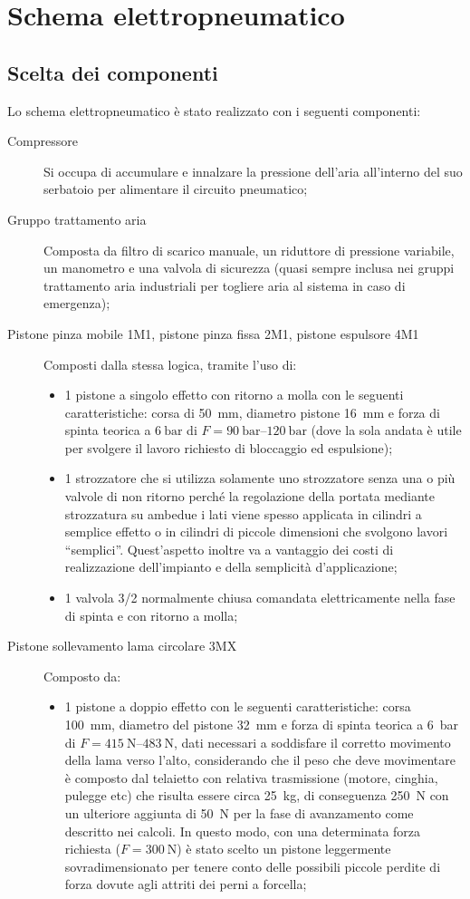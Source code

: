 \documentclass{report}
\begin{document}
\section{Schema elettropneumatico}
\subsection{Scelta dei componenti}
Lo schema elettropneumatico è stato realizzato con i seguenti componenti:
\begin{description}
\item[Compressore] Si occupa di accumulare e innalzare la pressione dell’aria all’interno del suo serbatoio per alimentare il circuito pneumatico;
\item[Gruppo trattamento aria] Composta da filtro di scarico manuale, un riduttore di pressione variabile, un manometro e una valvola di sicurezza (quasi sempre inclusa nei gruppi trattamento aria industriali per togliere aria al sistema in caso di emergenza);
\item[Pistone pinza mobile 1M1, pistone pinza fissa 2M1, pistone espulsore 4M1] Composti dalla stessa logica, tramite l'uso di:
  \begin{itemize}
  \item 1 pistone a singolo effetto con ritorno a molla con le seguenti caratteristiche: corsa di \SI{50}{\mm}, diametro pistone \SI{16}{\mm} e forza di spinta teorica a $\SI{6}{\bar}$ di $F=\SIrange{90}{120}{\bar}$ (dove la sola andata è utile per svolgere il lavoro richiesto di bloccaggio ed espulsione);
  \item 1 strozzatore che si utilizza solamente uno strozzatore senza una o più valvole di non ritorno perché la regolazione della portata mediante strozzatura su ambedue i lati viene spesso applicata in cilindri a semplice effetto o in cilindri di piccole dimensioni che svolgono lavori “semplici”. Quest’aspetto inoltre va a vantaggio dei costi di realizzazione dell’impianto e della semplicità d’applicazione;
  \item 1 valvola 3/2 normalmente chiusa comandata elettricamente nella fase di spinta e con ritorno a molla;
  \end{itemize}
\item[Pistone sollevamento lama circolare 3MX] Composto da:
  \begin{itemize}
  \item 1 pistone a doppio effetto con le seguenti caratteristiche: corsa \SI{100}{\mm}, diametro del pistone \SI{32}{\mm} e forza di spinta teorica a \SI{6}{\bar} di $F=\SIrange{415}{483}{\N}$, dati necessari a soddisfare il corretto movimento della lama verso l'alto, considerando che il peso che deve movimentare è composto dal telaietto con relativa trasmissione (motore, cinghia, pulegge etc) che risulta essere circa \SI{25}{\kg}, di conseguenza \SI{250}{\N} con un ulteriore aggiunta di \SI{50}{\N} per la fase di avanzamento come descritto nei calcoli. In questo modo, con una determinata forza richiesta ($F=\SI{300}{\N}$) è stato scelto un pistone leggermente sovradimensionato per tenere conto delle possibili piccole perdite di forza dovute agli attriti dei perni a forcella;

\end{itemize}
\end{description}
\end{document}
